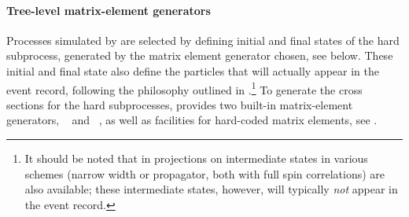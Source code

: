 \mcsubsection{\gensectionhard}
\label{Sec:hard_process_sherpa}
\paragraph{Tree-level matrix-element generators}

Processes simulated by \Sherpa are selected by defining initial and final 
states of the hard subprocess, generated by the matrix element generator chosen, 
see below.  These initial and final state also define the particles that 
will actually appear in the event record, following the philosophy outlined 
in .\footnote{
  It should be noted that in \Sherpa projections on intermediate states
  in various schemes (narrow width or propagator, both with full spin
  correlations) are also available; these intermediate states, however, will
  typically {\em not} appear in the event record.
}
To generate the cross sections for the hard subprocesses, \Sherpa provides 
two built-in matrix-element generators, \Amegic~\cite{Krauss:2001iv} and 
\Comix~\cite{Gleisberg:2008fv}, as well as facilities for hard-coded matrix 
elements, see .

